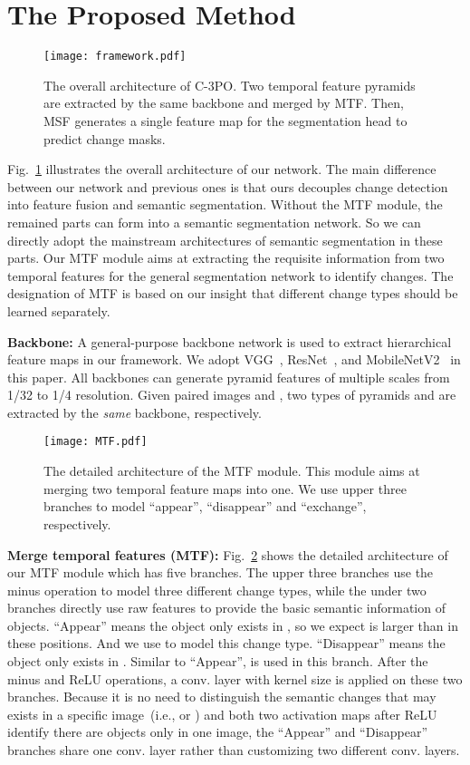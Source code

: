 \documentclass[review]{elsarticle}
\begin{document}
\section{The Proposed Method}

\begin{figure}
	\centering
	\texttt{[image: framework.pdf]}
	\caption{The overall architecture of C-3PO. Two temporal feature pyramids are extracted by the same backbone and merged by MTF. Then, MSF generates a single feature map for the segmentation head to predict change masks.}
	\label{fig:framework}
\end{figure}

Fig.~\ref{fig:framework} illustrates the overall architecture of our network. The main difference between our network and previous ones is that ours decouples change detection into feature fusion and semantic segmentation. Without the MTF module, the remained parts can form into a semantic segmentation network. So we can directly adopt the mainstream architectures of semantic segmentation in these parts. Our MTF module aims at extracting the requisite information from two temporal features for the general segmentation network to identify changes. The designation of MTF is based on our insight that different change types should be learned separately.

\textbf{Backbone:} A general-purpose backbone network is used to extract hierarchical feature maps in our framework. We adopt VGG~\cite{VGG}, ResNet~\cite{ResNet}, and MobileNetV2~\cite{mobilenet} in this paper. All backbones can generate pyramid features of multiple scales from 1/32 to 1/4 resolution. Given paired images  and , two types of pyramids  and  are extracted by the \emph{same} backbone, respectively. 

\begin{figure}
	\centering
	\texttt{[image: MTF.pdf]}
	\caption{The detailed architecture of the MTF module. This module aims at merging two temporal feature maps into one. We use upper three branches to model ``appear'', ``disappear'' and ``exchange'', respectively.}
	\label{fig:MTF}
\end{figure}

\textbf{Merge temporal features (MTF):} Fig.~\ref{fig:MTF} shows the detailed architecture of our MTF module which has five branches. The upper three branches use the minus operation to model three different change types, while the under two branches directly use raw features to provide the basic semantic information of objects. ``Appear'' means the object only exists in , so we expect  is larger than  in these positions. And we use  to model this change type. ``Disappear'' means the object only exists in . Similar to ``Appear'',  is used in this branch. After the minus and ReLU operations, a conv. layer with kernel size  is applied on these two branches. Because it is no need to distinguish the semantic changes that may exists in a specific image~(i.e.,  or ) and both two activation maps after ReLU identify there are objects only in one image, the ``Appear'' and ``Disappear'' branches share one conv. layer rather than customizing two different conv. layers.
\end{document}
